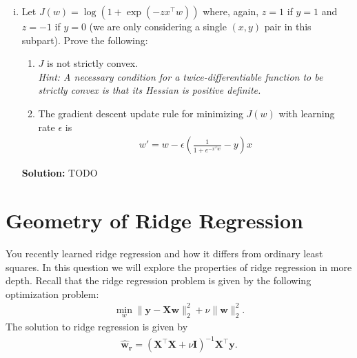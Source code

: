 \documentclass{article}
\newcommand{\mat}[1]{\mathbf{#1}}
\renewcommand{\vec}[1]{\boldsymbol{\mathbf{#1}}}
\newcommand{\Question}[1]{\Large \section{ #1 } \normalsize}
\newenvironment{solution}{\color{blue} \smallskip \textbf{Solution:}}{}
\begin{document}
\begin{enumerate}[(a)]
\begin{enumerate}[(i)]
        \begin{solution}
            TODO
        \end{solution}

        \item Let $J(w) = \log(1+\exp(-zx^\top w))$ where, again, $z = 1$ if $y = 1$ and $z = -1$ if $y = 0$ (we are only considering a single $(x, y)$ pair in this subpart). Prove the following:
        \begin{enumerate}
            \item $J$ is not strictly convex. \\
            \emph{Hint: A necessary condition for a twice-differentiable function to be strictly convex is that its Hessian is positive definite.}
            \item The gradient descent update rule for minimizing $J(w)$ with learning rate $\epsilon$ is 
            \begin{align*}
                w' = w - \epsilon\left(\frac{1}{1 + e^{-x^{T}w}} - y\right)x
            \end{align*}
        \end{enumerate}

        \begin{solution}
            TODO
        \end{solution}
    \end{enumerate}
\end{enumerate}

\newpage
\Question{Geometry of Ridge Regression}
You recently learned ridge regression and how it differs from ordinary least squares. In this question we will explore the properties of ridge regression in more depth. Recall that the ridge regression problem is given by the following optimization problem:
\begin{align}
    \min_{w} \|\vec{y} - \mat{X} \vec{w}\|_2^2 + \nu \|\vec{w}\|_2^2. \label{eq:ridge}
\end{align}
The solution to ridge regression is given by
\begin{align}
\vec{\hat{w}_{r}} = (\mat{X}^\top \mat{X} + \nu \mat{I})^{-1} \mat{X}^\top \vec{y}. \label{eq:ridge_sol}
\end{align}
\end{document}
